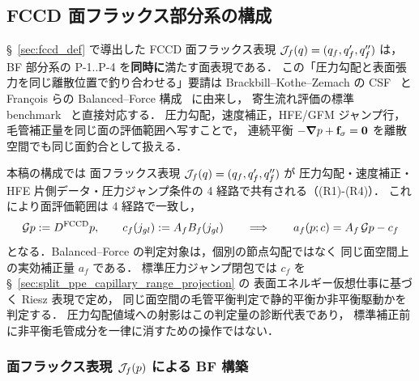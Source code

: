 %
%
\subsection{FCCD 面フラックス部分系の構成}
\label{sec:fccd_bf_sub_system}

§~\ref{sec:fccd_def} で導出した FCCD 面フラックス表現
$\mathcal{J}_{f}\!\left(q\right)=(q_f,q'_f,q''_f)$ は，BF 部分系の
P-1..P-4 を\textbf{同時に}満たす面表現である．
この「圧力勾配と表面張力を同じ離散位置で釣り合わせる」要請は
Brackbill--Kothe--Zemach の CSF~\cite{Brackbill1992} と
Fran{\c{c}}ois らの Balanced--Force 構成~\cite{Francois2006} に由来し，
寄生流れ評価の標準 benchmark~\cite{Popinet2009,DennerVanWachem2015} と直接対応する．
圧力勾配，速度補正，HFE/GFM ジャンプ行，毛管補正量を同じ面の評価範囲へ写すことで，
連続平衡
$-\bm{\nabla} p+\mathbf{f}_\sigma=\mathbf{0}$
を離散空間でも同じ面釣合として扱える．

\label{sec:fccd_face_residual_order}

本稿の構成では {\FCCD} 面フラックス表現 $\mathcal{J}_{f}\!\left(q\right)=(q_f,q'_f,q''_f)$ が
圧力勾配・速度補正・HFE 片側データ・圧力ジャンプ条件の 4 経路で共有される（(R1)-(R4)）．
これにより面評価範囲は 4 経路で一致し，
\begin{equation}
  \mathcal{G}p := D^{\mathrm{FCCD}} p,
  \qquad c_f(j_{gl}) := A_f B_f(j_{gl})
  \qquad\Longrightarrow\qquad
  a_f(p;c)=A_f\,\mathcal{G}p-c_f
  \label{eq:bf_fccd_unification}
\end{equation}
となる．Balanced--Force の判定対象は，個別の節点勾配ではなく
同じ面空間上の実効補正量 $a_f$ である．
標準圧力ジャンプ閉包では $c_f$ を
§~\ref{sec:split_ppe_capillary_range_projection} の
表面エネルギー仮想仕事に基づく Riesz 表現で定め，
同じ面空間の毛管平衡判定で静的平衡か非平衡駆動かを判定する．
圧力勾配値域への射影はこの判定量の診断代表であり，
標準補正前に非平衡毛管成分を一律に消すための操作ではない．

\subsubsection{\texorpdfstring{面フラックス表現 $\mathcal{J}_{f}\!\left(p\right)$ による BF 構築}{面フラックス表現 FaceJet(p) による BF 構築}}
\label{sec:face_jet_bf_construction}

